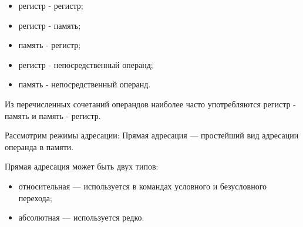 \begin{itemize}
\item регистр - регистр;
\item регистр - память;
\item память - регистр;
\item регистр - непосредственный операнд;
\item память - непосредственный операнд.
\end{itemize}

Из перечисленных сочетаний операндов наиболее часто употребляются регистр - память и
память - регистр.

Рассмотрим режимы адресации:
Прямая адресация --- простейший вид адресации операнда в памяти.

Прямая адресация может быть двух типов:
\begin{itemize}
\item относительная --- используется в командах условного и безусловного перехода;
\item абсолютная --- используется редко.
\end{itemize}
